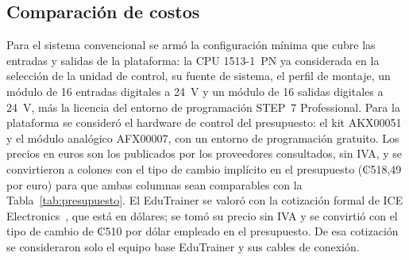 \documentclass[12pt,a4paper,oneside]{report}
\begin{document}
\subsection{Comparación de costos}

Para el sistema convencional se armó la configuración mínima que cubre las entradas y salidas de la plataforma: la CPU 1513-1~PN ya considerada en la selección de la unidad de control, su fuente de sistema, el perfil de montaje, un módulo de 16 entradas digitales a 24~V y un módulo de 16 salidas digitales a 24~V, más la licencia del entorno de programación STEP~7 Professional. Para la plataforma se consideró el hardware de control del presupuesto: el kit AKX00051 y el módulo analógico AFX00007, con un entorno de programación gratuito. Los precios en euros son los publicados por los proveedores consultados, sin IVA, y se convirtieron a colones con el tipo de cambio implícito en el presupuesto (₡518,49 por euro) para que ambas columnas sean comparables con la Tabla~\ref{tab:presupuesto}. El EduTrainer se valoró con la cotización formal de ICE Electronics~\cite{ref47}, que está en dólares; se tomó su precio sin IVA y se convirtió con el tipo de cambio de ₡510 por dólar empleado en el presupuesto. De esa cotización se consideraron solo el equipo base EduTrainer y sus cables de conexión.
\end{document}
